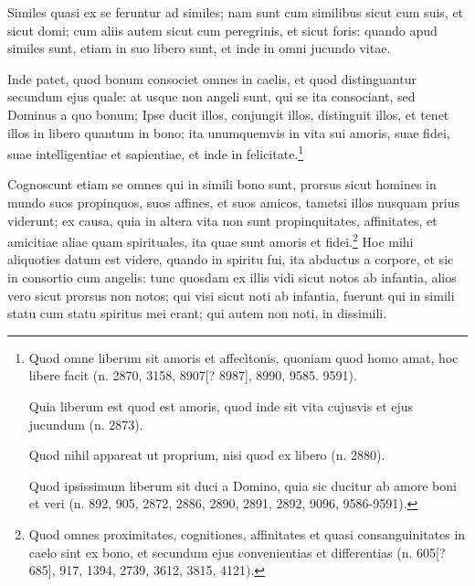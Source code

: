 \begin{topic}{44}
    Similes quasi ex se feruntur ad similes; nam sunt cum similibus sicut cum suis, et sicut domi; cum aliis autem sicut
    cum peregrinis, et sicut foris: quando apud similes sunt, etiam in suo libero sunt, et inde in omni jucundo vitae.
\end{topic}

\begin{topic}{45}
    Inde patet, quod bonum consociet omnes in caelis, et quod distinguantur secundum ejus quale: at usque non angeli
    sunt, qui se ita consociant, sed Dominus a quo bonum; Ipse ducit illos, conjungit illos, distinguit illos, et tenet
    illos in libero quantum in bono; ita unumquemvis in vita sui amoris, suae fidei, suae intelligentiae et sapientiae,
    et inde in felicitate.\footnote{Quod omne liberum sit amoris et affecìtonis, quoniam quod homo amat, hoc libere
    facit (n. 2870, 3158, 8907[? 8987], 8990, 9585. 9591).

    Quia liberum est quod est amoris, quod inde sit vita cujusvis et ejus jucundum (n. 2873).

    Quod nihil appareat ut proprium, nisi quod ex libero (n. 2880).

    Quod ipsissimum liberum sit duci a Domino, quia sic ducitur ab amore boni et veri (n. 892, 905, 2872, 2886, 2890,
    2891, 2892, 9096, 9586-9591).}
\end{topic}

\begin{topic}{46}
    Cognoscunt etiam se omnes qui in simili bono sunt, prorsus sicut homines in mundo suos propinquos, suos affines, et
    suos amicos, tametsi illos nusquam prius viderunt; ex causa, quia in altera vita non sunt propinquitates,
    affinitates, et amicitiae aliae quam spirituales, ita quae sunt amoris et fidei.\footnote{Quod omnes proximitates,
    cognitiones, affinitates et quasi consanguinitates in caelo sint ex bono, et secundum ejus convenientias et
    differentias (n. 605[? 685], 917, 1394, 2739, 3612, 3815, 4121).} Hoc mihi aliquoties datum est videre, quando in
    spiritu fui, ita abductus a corpore, et sic in consortio cum angelis: tunc quosdam ex illis vidi sicut notos ab
    infantia, alios vero sicut prorsus non notos; qui visi sicut noti ab infantia, fuerunt qui in simili statu cum statu
    spiritus mei erant; qui autem non noti, in dissimili.
\end{topic}


